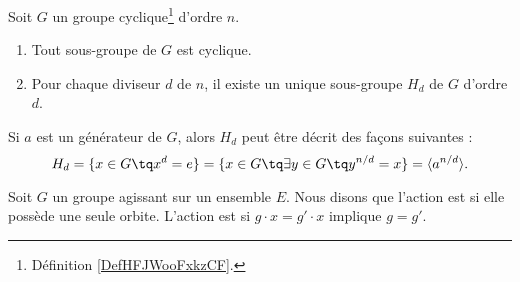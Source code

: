 \begin{theorem}     \label{THOooRGSTooIWyhqt}
	Soit \( G\) un groupe cyclique\footnote{Définition \ref{DefHFJWooFxkzCF}.} d'ordre \( n\).
	\begin{enumerate}
		\item
		      Tout sous-groupe de \( G\) est cyclique.
		\item
		      Pour chaque diviseur \( d\) de \( n\), il existe un unique sous-groupe \( H_d\) de \( G\) d'ordre \( d\).
	\end{enumerate}
	Si \( a\) est un générateur de \( G\), alors \( H_d\) peut être décrit des façons suivantes :
	\begin{equation}
		H_d=\{ x\in G\tq x^d=e \}=\{ x\in G\tq\exists y\in G\tq y^{n/d}=x \}=\langle a^{n/d}\rangle.
	\end{equation}
\end{theorem}


\begin{definition}      \label{DEFooQDHPooCfDEuL}
	Soit \( G\) un groupe agissant sur un ensemble \( E\). Nous disons que l'action est  si elle possède une seule orbite. L'action est  si \( g\cdot x=g'\cdot x\) implique \( g=g'\).
\end{definition}
